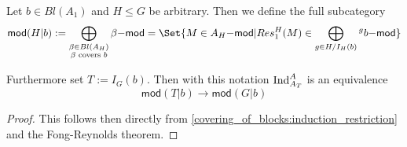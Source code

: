 \begin{lemmadef}
Let $b\in Bl(A_1)$ and $H\leq G$ be arbitrary. Then we define the full subcategory
\[\mathsf{mod}(H|b) := \bigoplus_{\substack{\beta \in Bl(A_H) \\ \beta \text{ covers } b}} \beta\mathsf{-mod} = \Set{M \in A_H\mathsf{-mod} | Res_1^H(M) \in \bigoplus_{g\in H/I_H(b)} {^g b}\mathsf{-mod}}\]

Furthermore set $T:=I_G(b)$. Then with this notation $\operatorname{Ind}_{A_T}^A$ is an equivalence
\[\mathsf{mod}(T|b) \to \mathsf{mod}(G|b)\]
\end{lemmadef}
\begin{proof}
This follows then directly from \ref{covering_of_blocks:induction_restriction} and the Fong-Reynolds theorem.
\end{proof}
